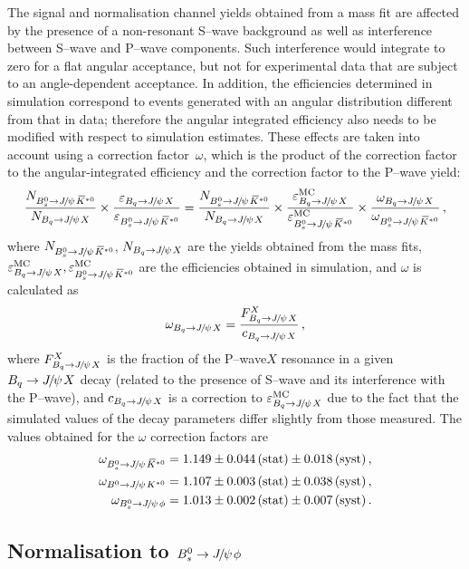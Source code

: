 \documentclass[12pt,a4paper]{article}
\def\PJ      {\ensuremath{J}\xspace}
\def\Ppsi {\ensuremath{\psi}\xspace}
\def\jpsi     {{\ensuremath{{\PJ\mskip -3mu/\mskip -2mu\Ppsi\mskip 2mu}}}\xspace}
\newcommand{\BJpsiX}{\ensuremath{B_{q}\to \jpsi X}\xspace}
\newcommand{\BdJpsiKst}{\ensuremath{B^0\to \jpsi K^{*0}}\xspace}
\newcommand{\BsJpsiKst}{\ensuremath{B^0_s\to \jpsi \Kstarzb}\xspace}
\newcommand{\BsJpsiPhi}{\ensuremath{B^0_s\to \jpsi \phi}\xspace}
\def\Kbar  {\kern 0.2em\overline{\kern -0.2em K}{}\xspace}
\def\Kstarzb {\ensuremath{\Kbar^{*0}}\xspace}
\newcommand{\swave}{{\rm S--wave}\xspace}
\newcommand{\pwave}{{\rm P--wave}\xspace}
\begin{document}
The signal and normalisation channel yields obtained from a mass fit are affected by the presence
of a non-resonant \swave background as well as interference between \swave and \pwave components. Such interference would integrate to
zero for a flat angular acceptance, but not for experimental data that are subject to an angle-dependent
acceptance. In addition, the efficiencies determined in simulation correspond to events generated with an angular distribution different from that in data; therefore the angular integrated efficiency also needs to be modified with respect to simulation
estimates.
These effects are taken into account using a correction factor~$\omega$, which is the product of the
correction factor to the angular-integrated efficiency and the correction factor to the \pwave yield:
\begin{equation}
\frac{N_{\BsJpsiKst}}{N_{\BJpsiX}}\times\frac{\varepsilon_{\BJpsiX}}{\varepsilon_{\BsJpsiKst}} = 
 \frac{N_{\BsJpsiKst}}{N_{\BJpsiX}}\times\frac{\varepsilon_{\BJpsiX}^{\rm MC}}{\varepsilon_{\BsJpsiKst}^{\rm MC}}\times\frac{\omega_{\BJpsiX}}{\omega_{\BsJpsiKst}} \,,
\end{equation}
\noindent where $N_{\BsJpsiKst}$, $N_{\BJpsiX}$ are the yields obtained from the mass fits,
$\varepsilon_{\BJpsiX}^{\rm MC}, \varepsilon_{\BsJpsiKst}^{\rm MC}$ are the efficiencies obtained in
simulation, and $\omega$ is calculated as
\begin{equation}
\omega_{\BJpsiX} = \frac{F_{\BJpsiX}^X}{c_{\BJpsiX}} \,,
\end{equation}
\noindent where $F_{\BJpsiX}^X$ is the fraction of the \pwave $X$ resonance in a given $\BJpsiX$ decay (related to the presence of \swave and its interference with the \pwave), and $c_{\BJpsiX}$ is a correction to $\varepsilon_{\BJpsiX}^{\rm MC}$ due to the fact that the simulated values of the decay parameters differ slightly from those measured.
The values obtained for the $\omega$ correction factors are
\begin{align}
\omega_{\BsJpsiKst} &= 1.149 \pm 0.044 \,{\rm (stat)} \pm 0.018 \,{\rm (syst)}  \,, \nonumber \\
\omega_{\BdJpsiKst} &= 1.107 \pm 0.003 \,{\rm (stat)} \pm 0.038 \,{\rm (syst)}  \,, \nonumber \\
\omega_{\BsJpsiPhi} &= 1.013 \pm 0.002 \,{\rm (stat)} \pm 0.007 \,{\rm (syst)} \,. \nonumber
\end{align}



\subsection{Normalisation to \BsJpsiPhi}\label{sec:BF_norm_JpsiKK}
\end{document}
